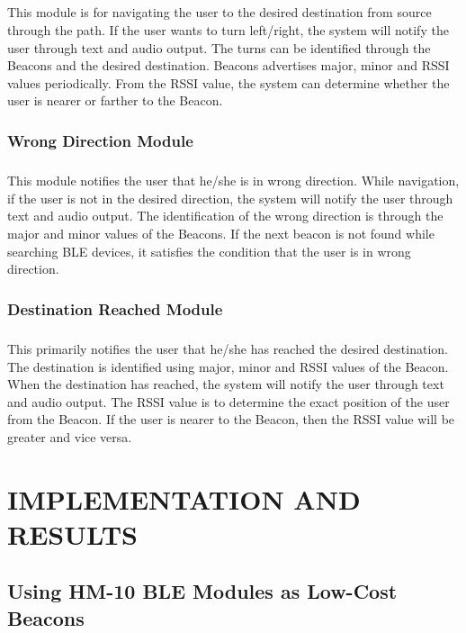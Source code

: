 \documentclass[a4paper,12pt]{report}
\begin{document}
\paragraph{}This module is for navigating the user to the desired destination from source through the path. If the user wants to turn left/right, the system will notify the user through text and audio output. The turns can be identified through the Beacons and the desired destination. Beacons advertises major, minor and RSSI values periodically. From the RSSI value, the system can determine whether the user is nearer or farther to the Beacon.
\newpage
\subsection{Wrong Direction Module}
\paragraph{}This module notifies the user that he/she is in wrong direction. While navigation, if the user is not in the desired direction, the system will notify the user through text and audio output. The identification of the wrong direction is through the major and minor values of the Beacons. If the next beacon is not found while searching BLE devices, it satisfies the condition that the user is in wrong direction.
\subsection{Destination Reached Module}
\paragraph{}This primarily notifies the user that he/she has reached the desired destination. The destination is identified using major, minor and RSSI values of the Beacon. When the destination has reached, the system will notify the user through text and audio output. The RSSI value is to determine the exact position of the user from the Beacon. If the user is nearer to the Beacon, then the RSSI value will be greater and vice versa.
\renewcommand\chaptername{CHAPTER}
\chapter{IMPLEMENTATION AND RESULTS}
\section{Using HM-10 BLE Modules as Low-Cost Beacons}
\end{document}
